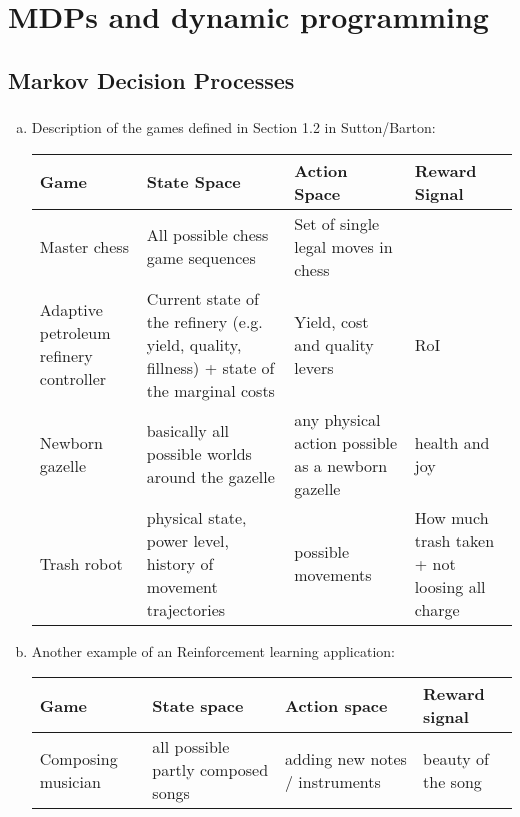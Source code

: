 \documentclass{article}
\begin{document}
\section{MDPs and dynamic programming}
\subsection{Markov Decision Processes}
\subsubsection{}
\begin{enumerate}[(a)]
  \item Description of the games defined in Section 1.2 in Sutton/Barton:
  \begin{center}
    \hspace*{-3cm}\begin{tabular}{p{3cm}p{4cm}p{4cm}p{4cm}}
      Game & State Space & Action Space & Reward Signal \\\toprule
      Master chess & All possible chess game sequences & Set of single legal moves in chess & \\\midrule
      Adaptive petroleum refinery controller & Current state of the refinery (e.g. yield, quality, fillness) + state of the marginal costs & Yield, cost and quality levers & RoI \\\midrule
      Newborn gazelle & basically all possible worlds around the gazelle & any physical action possible as a newborn gazelle & health and joy \\\midrule
      Trash robot & physical state, power level, history of movement trajectories & possible movements & How much trash taken + not loosing all charge \\\bottomrule
    \end{tabular}
  \end{center}

  \item Another example of an Reinforcement learning application:
  \hfill
  \begin{center}
    \hspace*{-3cm}\begin{tabular}{p{3cm}p{4cm}p{4cm}p{4cm}}
      Game & State space & Action space & Reward signal \\\toprule
      Composing musician & all possible partly composed songs & adding new notes / instruments & beauty of the song \\\bottomrule
    \end{tabular}
  \end{center}


\end{enumerate}
\end{document}
